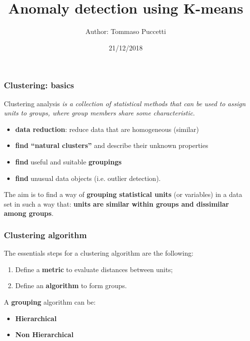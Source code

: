 \documentclass[xcolor ={table,usenames,dvipsnames}]{beamer}
\title{Anomaly detection using K-means}
\author{Author: Tommaso Puccetti}
\institute{Universit\`a  degli Studi di Firenze}
\date{21/12/2018}
\theoremstyle{definition}
\begin{document}
	
	\begin{frame}
		\maketitle
	\end{frame}

	\begin{frame}
		\frametitle{Clustering: basics}
			Clustering analysis \textit{is a collection of statistical methods that can be used to assign units
				to groups, where group members share some characteristic}.  
			
			\begin{itemize}
				\item \textbf{data reduction}: reduce data that are homogeneous (similar)
				\item \textbf{find “natural clusters”} and describe their unknown properties
				\item \textbf{find} useful and suitable \textbf{groupings}
				\item \textbf{find} unusual data objects (i.e. outlier detection).
			\end{itemize}
		
			The aim is to find a way of \textbf{grouping statistical units} (or variables) in a data
			set in such a way that:
			\textbf{units are similar within groups and dissimilar among groups}.
	\end{frame}

	\begin{frame}
		\frametitle{Clustering algorithm}
			The essentials steps for a clustering algorithm are the following:
			
			\begin{enumerate}
				\item Define a \textbf{metric} to evaluate distances between units;
				\item Define an \textbf{algorithm} to form groups. \\
			\end{enumerate}
			
			A \textbf{grouping} algorithm can be:
			\begin{itemize}
				\item \textbf{Hierarchical}
				\item \textbf{Non Hierarchical}
			\end{itemize}	
	\end{frame}
\end{document}

